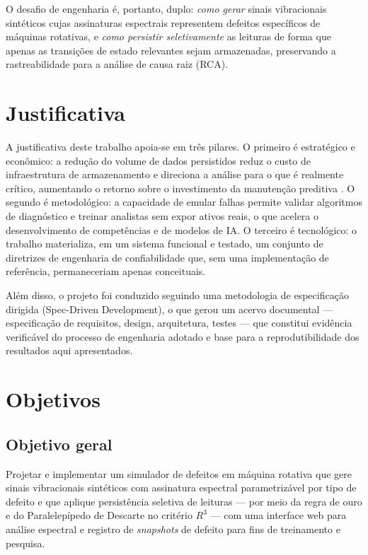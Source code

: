 O desafio de engenharia é, portanto, duplo: \emph{como gerar} sinais
vibracionais sintéticos cujas assinaturas espectrais representem defeitos
específicos de máquinas rotativas, e \emph{como persistir seletivamente} as
leituras de forma que apenas as transições de estado relevantes sejam
armazenadas, preservando a rastreabilidade para a análise de causa raiz (RCA).

\section{Justificativa}

A justificativa deste trabalho apoia-se em três pilares. O primeiro é
estratégico e econômico: a redução do volume de dados persistidos reduz o
custo de infraestrutura de armazenamento e direciona a análise para o que é
realmente crítico, aumentando o retorno sobre o investimento da manutenção
preditiva \cite{scheffer2004}. O segundo é metodológico: a capacidade de
emular falhas permite validar algoritmos de diagnóstico e treinar analistas sem
expor ativos reais, o que acelera o desenvolvimento de competências e de
modelos de IA. O terceiro é tecnológico: o trabalho materializa, em um sistema
funcional e testado, um conjunto de diretrizes de engenharia de confiabilidade
que, sem uma implementação de referência, permaneceriam apenas conceituais.

Além disso, o projeto foi conduzido seguindo uma metodologia de
especificação dirigida (Spec-Driven Development), o que gerou um acervo
documental --- especificação de requisitos, design, arquitetura, testes --- que
constitui evidência verificável do processo de engenharia adotado e base para a
reprodutibilidade dos resultados aqui apresentados.

\section{Objetivos}

\subsection{Objetivo geral}

Projetar e implementar um simulador de defeitos em máquina rotativa que gere
sinais vibracionais sintéticos com assinatura espectral parametrizável por tipo
de defeito e que aplique persistência seletiva de leituras --- por meio da
regra de ouro e do Paralelepípedo de Descarte no critério \(R^3\) --- com uma
interface web para análise espectral e registro de \emph{snapshots} de defeito
para fins de treinamento e pesquisa.

